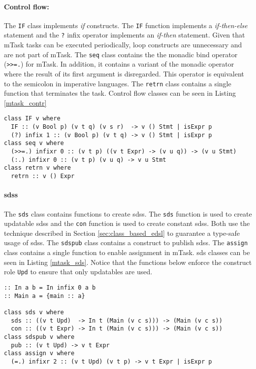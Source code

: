 \paragraph{Control flow:} The \texttt{IF} class implements \textit{if} constructs. The \texttt{IF} function implements a \textit{if-then-else} statement and the \texttt{?} infix operator implements an \textit{if-then} statement. Given that mTask tasks can be executed periodically, loop constructs are unnecessary and are not part of mTask. The \texttt{seq} class contains the the monadic bind operator (\texttt{>>=.}) for mTask. In addition, it contains a variant of the monadic operator where the result of its first argument is disregarded. This operator is equivalent to the semicolon in imperative languages. The \texttt{retrn} class contains a single function that terminates the task. Control flow classes can be seen in Listing \ref{mtask_contr}

\begin{lstlisting}[caption=mTask control flow classes,captionpos=b,label=mtask_contr]
class IF v where
  IF :: (v Bool p) (v t q) (v s r)  -> v () Stmt | isExpr p
  (?) infix 1 :: (v Bool p) (v t q) -> v () Stmt | isExpr p
class seq v where
  (>>=.) infixr 0 :: (v t p) ((v t Expr) -> (v u q)) -> (v u Stmt) 
  (:.) infixr 0 :: (v t p) (v u q) -> v u Stmt 
class retrn v where
  retrn :: v () Expr
\end{lstlisting}

\paragraph{\aclp{sds}} The \texttt{sds} class contains functions to create \aclp{sds}. The \texttt{sds} function is used to create updatable \acp{sds} and the \texttt{con} function is used to create constant \acp{sds}. Both use the technique described in Section \ref{sec:class_based_edsl} to guarantee a type-safe usage of \acp{sds}. The \texttt{sdspub} class contains a construct to publish \acp{sds}. The \texttt{assign} class contains a single function to enable assignment in mTask. \ac{sds} classes can be seen in Listing \ref{mtask_sds}. Notice that the functions below enforce the construct role \texttt{Upd} to ensure that only updatables are used.

\begin{lstlisting}[caption=mTask SDS classes,captionpos=b,label=mtask_sds]
:: In a b = In infix 0 a b
:: Main a = {main :: a}

class sds v where
  sds :: ((v t Upd)  -> In t (Main (v c s))) -> (Main (v c s))
  con :: ((v t Expr) -> In t (Main (v c s))) -> (Main (v c s)) 
class sdspub v where
  pub :: (v t Upd) -> v t Expr
class assign v where
  (=.) infixr 2 :: (v t Upd) (v t p) -> v t Expr | isExpr p
\end{lstlisting}

